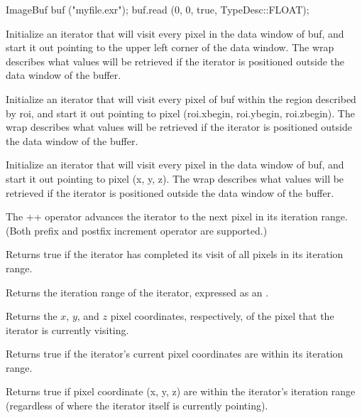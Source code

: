 \begin{code}
ImageBuf buf ("myfile.exr");
buf.read (0, 0, true, TypeDesc::FLOAT);
\end{code}


Initialize an iterator that will visit every pixel in the data window
of {\cf buf}, and start it out pointing to the upper left corner of
the data window.  The {\cf wrap} describes what values will be retrieved
if the iterator is positioned outside the data window of the buffer.
\apiend

Initialize an iterator that will visit every pixel of {\cf buf} 
within the region
described by {\cf roi}, and start it out pointing to pixel ({\cf roi.xbegin, roi.ybegin, roi.zbegin}).
The {\cf wrap} describes what values will be retrieved
if the iterator is positioned outside the data window of the buffer.
\apiend

Initialize an iterator that will visit every pixel in the data window
of {\cf buf}, and start it out pointing to pixel ({\cf x, y, z}).
The {\cf wrap} describes what values will be retrieved
if the iterator is positioned outside the data window of the buffer.
\apiend

The {\cf ++} operator advances the iterator to the next pixel in its
iteration range.  (Both prefix and postfix increment operator are
supported.)
\apiend

Returns {\cf true} if the iterator has completed its visit of all pixels
in its iteration range.
\apiend

Returns the iteration range of the iterator, expressed as an \ROI.
\apiend

Returns the $x$, $y$, and $z$ pixel coordinates, respectively, of the
pixel that the iterator is currently visiting.
\apiend

Returns {\cf true} if the iterator's current pixel coordinates 
are within its iteration range.
\apiend

Returns {\cf true} if pixel coordinate ({\cf x, y, z}) are within the
iterator's iteration range (regardless of where the iterator itself
is currently pointing).
\apiend


